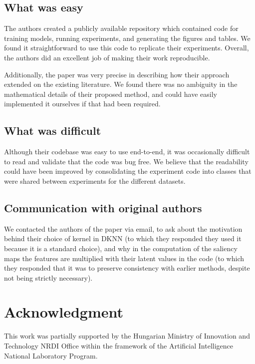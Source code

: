 \subsection{What was easy}

The authors created a publicly available repository which contained code for training models, running experiments, and generating the figures and tables. We found it straightforward to use this code to replicate their experiments. Overall, the authors did an excellent job of making their work reproducible.

\vspace{1em}

Additionally, the paper was very precise in describing how their approach extended on the existing literature. We found there was no ambiguity in the mathematical details of their proposed method, and could have easily implemented it ourselves if that had been required.

\subsection{What was difficult}

Although their codebase was easy to use end-to-end, it was occasionally difficult to read and validate that the code was bug free. We believe that the readability could have been improved by consolidating the experiment code into classes that were shared between experiments for the different datasets.

\subsection{Communication with original authors}
We contacted the authors of the paper via email, to ask about the motivation behind their choice of kernel in DKNN (to which they responded they used it because it is a standard choice), and why in the computation of the saliency maps the features are multiplied with their latent values in the code (to which they responded that it was to preserve consistency with earlier methods, despite not being strictly necessary).


\section{Acknowledgment}

This work was partially supported by the Hungarian Ministry of Innovation and Technology NRDI Office within the framework of the Artificial Intelligence National Laboratory Program.